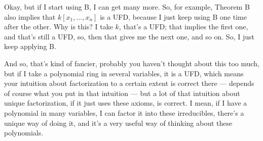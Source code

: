 \begin{content}

\end{content}

\begin{speech}[00:21:02 - 00:22:15]
Okay, but if I start using B, I can get many more. So, for example,  Theorem B also implies that $k[x_1, \dots, x_n]$  is a UFD, because I just keep using B one time after the other. Why is this? I take $k$, that's a UFD; that implies the first one, and that's still a UFD, so, then that gives me the next one,  and so on. So, I just keep applying B.

And so, that's kind of fancier, probably you haven't thought about this too much, but if I take a polynomial ring in several variables, it is a UFD, which means your intuition about factorization to a certain extent is correct there --- depends of course what you put in that intuition --- but a lot of that intuition about unique factorization, if it just uses these axioms, is correct. I mean, if I have a polynomial in many variables, I can factor it into these irreducibles, there's a unique way of doing it, and it's a very useful way of thinking about these polynomials.
\end{speech}

